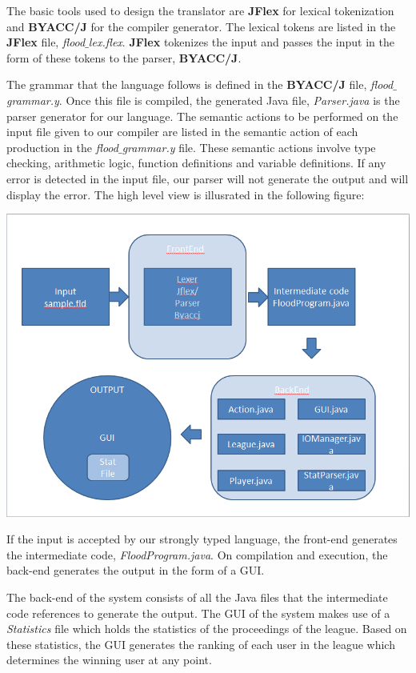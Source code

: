 \documentclass[12pt]{report}
\begin{document}
The basic tools used to design the translator are \textbf{JFlex} for lexical tokenization and \textbf{BYACC/J} for the compiler generator. The lexical tokens are listed in the \textbf{JFlex} file, \textit{flood$\_$lex.flex}. \textbf{JFlex} tokenizes the input and passes the input in the form of these tokens to the parser, \textbf{BYACC/J}.

The grammar that the language follows is defined in the \textbf{BYACC/J} file, \textit{flood$\_$grammar.y}. Once this file is compiled, the generated Java file, \textit{Parser.java} is the parser generator for our language. The semantic actions to be performed on the input file given to our compiler are listed in the semantic action of each production in the \textit{flood$\_$grammar.y} file. These semantic actions involve type checking, arithmetic logic, function definitions and variable definitions. If any error is detected in the input file, our parser will not generate the output and will display the error. The high level view is illusrated in the following figure:

\includegraphics[scale=0.7]{system_architecture.png}

If the input is accepted by our strongly typed language, the front-end generates the intermediate code, \textit{FloodProgram.java}. On compilation and execution, the back-end generates the output in the form of a GUI.

The back-end of the system consists of all the Java files that the intermediate code references to generate the output. The GUI of the system makes use of a \textit{Statistics} file which holds the statistics of the proceedings of the league. Based on these statistics, the GUI generates the ranking of each user in the league which determines the winning user at any point.
\end{document}

